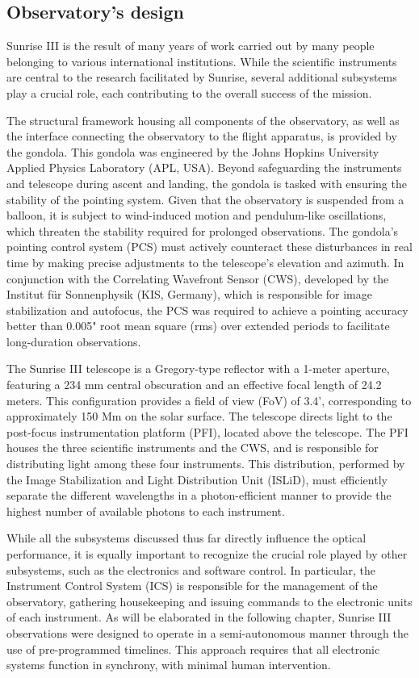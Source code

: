 \subsection{Observatory's design}

Sunrise III is the result of many years of work carried out by many people belonging to various international institutions.  While the scientific instruments are central to the research facilitated by Sunrise, several additional subsystems play a crucial role, each contributing to the overall success of the mission.

The structural framework housing all components of the observatory, as well as the interface connecting the observatory to the flight apparatus, is provided by the gondola. This gondola was engineered by the Johns Hopkins University Applied Physics Laboratory (APL, USA). Beyond safeguarding the instruments and telescope during ascent and landing, the gondola is tasked with ensuring the stability of the pointing system. Given that the observatory is suspended from a balloon, it is subject to wind-induced motion and pendulum-like oscillations, which threaten the stability required for prolonged observations. The gondola’s pointing control system (PCS) must actively counteract these disturbances in real time by making precise adjustments to the telescope’s elevation and azimuth. In conjunction with the Correlating Wavefront Sensor (CWS), developed by the Institut für Sonnenphysik (KIS, Germany), which is responsible for image stabilization and autofocus, the PCS was required to achieve a pointing accuracy better than 0.005" root mean square (rms) over extended periods to facilitate long-duration observations.

The Sunrise III telescope is a Gregory-type reflector with a 1-meter aperture, featuring a 234 mm central obscuration and an effective focal length of 24.2 meters. This configuration provides a field of view (FoV) of 3.4', corresponding to approximately 150 Mm on the solar surface. The telescope directs light to the post-focus instrumentation platform (PFI), located above the telescope. The PFI houses the three scientific instruments and the CWS, and is responsible for distributing light among these four instruments. This distribution, performed by the Image Stabilization and Light Distribution Unit (ISLiD), must efficiently separate the different wavelengths in a photon-efficient manner to provide the highest number of available photons to each instrument. 

While all the subsystems discussed thus far directly influence the optical performance, it is equally important to recognize the crucial role played by other subsystems, such as the electronics and software control. In particular, the Instrument Control System (ICS) is responsible for the management of the observatory, gathering housekeeping and issuing commands to the electronic units of each instrument. As will be elaborated in the following chapter, Sunrise III observations were designed to operate in a semi-autonomous manner through the use of pre-programmed timelines. This approach requires that all electronic systems function in synchrony, with minimal human intervention. 

